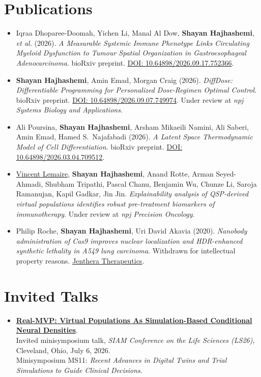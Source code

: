 \documentclass{article}
\newcommand{\cvsection}[1]{\section*{\rmfamily#1}}
\begin{document}
\section*{Publications}
\begin{itemize}[leftmargin=1em, itemsep=1pt]
    \item Iqraa Dhoparee-Doomah, Yichen Li, Manal Al Dow, \textbf{Shayan Hajhashemi}, \textit{et al.} (2026).
    \emph{A Measurable Systemic Immune Phenotype Links Circulating Myeloid Dysfunction to Tumour Spatial Organization in Gastroesophageal Adenocarcinoma}.
    bioRxiv preprint. \href{https://doi.org/10.64898/2026.09.17.752366}{DOI: 10.64898/2026.09.17.752366}.

    \item \textbf{Shayan Hajhashemi}, Amin Emad, Morgan Craig (2026).
    \emph{DiffDose: Differentiable Programming for Personalized Dose-Regimen Optimal Control}.
    bioRxiv preprint. \href{https://doi.org/10.64898/2026.09.07.749974}{DOI: 10.64898/2026.09.07.749974}.
    Under review at \emph{npj Systems Biology and Applications}.

    \item Ali Poursina, \textbf{Shayan Hajhashemi}, Arsham Mikaeili Namini, Ali Saberi, Amin Emad, Hamed S.~Najafabadi (2026).
    \emph{A Latent Space Thermodynamic Model of Cell Differentiation}.
    bioRxiv preprint. \href{https://doi.org/10.64898/2026.03.04.709512}{DOI: 10.64898/2026.03.04.709512}.

    \item \href{https://www.gene.com/scientists/our-scientists/vincent-lemaire}{Vincent Lemaire}, \textbf{Shayan Hajhashemi}, Anand Rotte, Arman Seyed-Ahmadi, Shubham Tripathi, Pascal Chanu, Benjamin Wu, Chunze Li, Saroja Ramanujan, Kapil Gadkar, Jin Jin.
    \emph{Explainability analysis of QSP-derived virtual populations identifies robust pre-treatment biomarkers of immunotherapy}.
    Under review at \emph{npj Precision Oncology}.

    \item Philip Roche, \textbf{Shayan Hajhashemi}, Uri David Akavia (2020).
    \emph{Nanobody administration of Cas9 improves nuclear localization and HDR-enhanced synthetic lethality in A549 lung carcinoma}.
    Withdrawn for intellectual property reasons. \href{https://www.jenthera.com/}{Jenthera Therapeutics}.
\end{itemize}


\cvsection{Invited Talks}
\begin{itemize}[leftmargin=1em]
    \item \href{https://meetings.siam.org/sess/dsp_talk.cfm?p=157552}{\textbf{Real-MVP: Virtual Populations As Simulation-Based Conditional Neural Densities}}.\\
    Invited minisymposium talk, \emph{SIAM Conference on the Life Sciences (LS26)}, Cleveland, Ohio, July 6, 2026.\\
    Minisymposium MS11: \emph{Recent Advances in Digital Twins and Trial Simulations to Guide Clinical Decisions}.
\end{itemize}
\end{document}
